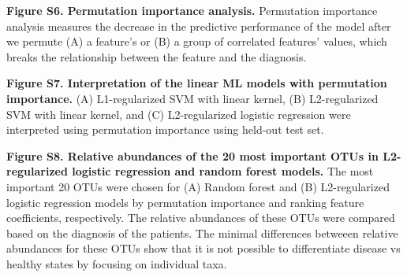 \documentclass[11pt,]{article}
\begin{document}
\hfill\break

\textbf{Figure S6. Permutation importance analysis.} Permutation
importance analysis measures the decrease in the predictive performance
of the model after we permute (A) a feature's or (B) a group of
correlated features' values, which breaks the relationship between the
feature and the diagnosis.

\hfill\break

\textbf{Figure S7. Interpretation of the linear ML models with
permutation importance.} (A) L1-regularized SVM with linear kernel, (B)
L2-regularized SVM with linear kernel, and (C) L2-regularized logistic
regression were interpreted using permutation importance using held-out
test set.

\hfill\break

\textbf{Figure S8. Relative abundances of the 20 most important OTUs in
L2-regularized logistic regression and random forest models.} The most
important 20 OTUs were chosen for (A) Random forest and (B)
L2-regularized logistic regression models by permutation importance and
ranking feature coefficients, respectively. The relative abundances of
these OTUs were compared based on the diagnosis of the patients. The
minimal differences betweeen relative abundances for these OTUs show
that it is not possible to differentiate disease vs healthy states by
focusing on individual taxa.
\end{document}
